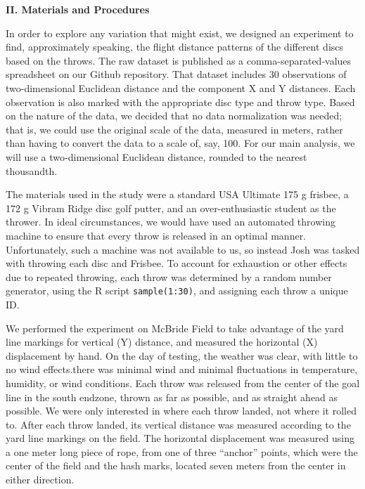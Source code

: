 \documentclass[letter,12pt]{article}
\begin{document}
	\begin{center}
		\textbf{II. Materials and Procedures}
	\end{center}
	\justify
	In order to explore any variation that might exist, we designed an experiment to find, approximately speaking, the flight distance patterns of the different discs based on the throws. The raw dataset is published as a comma-separated-values spreadsheet on our Github repository. That dataset includes 30 observations of two-dimensional Euclidean distance and the component X and Y distances. Each observation is also marked with the appropriate disc type and throw type. Based on the nature of the data, we decided that no data normalization was needed; that is, we could use the original scale of the data, measured in meters, rather than having to convert the data to a scale of, say, 100. For our main analysis, we will use a two-dimensional Euclidean distance, rounded to the nearest thousandth.\par
  The materials used in the study were a standard USA Ultimate 175 g frisbee, a 172 g Vibram Ridge disc golf putter, and an over-enthusiastic student as the thrower.  In ideal circumstances, we would have used an automated throwing machine to ensure that every throw is released in an optimal manner. Unfortunately, such a machine was not available to us, so instead Josh was tasked with throwing each disc and Frisbee. To account for exhaustion or other effects due to repeated throwing, each throw was determined by a random number generator, using the R script \verb|sample(1:30)|, and assigning each throw a unique ID.\par
  We performed the experiment on McBride Field to take advantage of the yard line markings for vertical (Y) distance, and measured the horizontal (X) displacement by hand. On the day of testing, the weather was clear, with little to no wind effects.there was minimal wind and minimal fluctuations in temperature, humidity, or wind conditions. Each throw was released from the center of the goal line in the south endzone, thrown as far as possible, and as straight ahead as possible. We were only interested in where each throw landed, not where it rolled to. After each throw landed, its vertical distance was measured according to the yard line markings on the field. The horizontal displacement was measured using a one meter long piece of rope, from one of three “anchor” points, which were the center of the field and the hash marks, located seven meters from the center in either direction.\par
\end{document}

